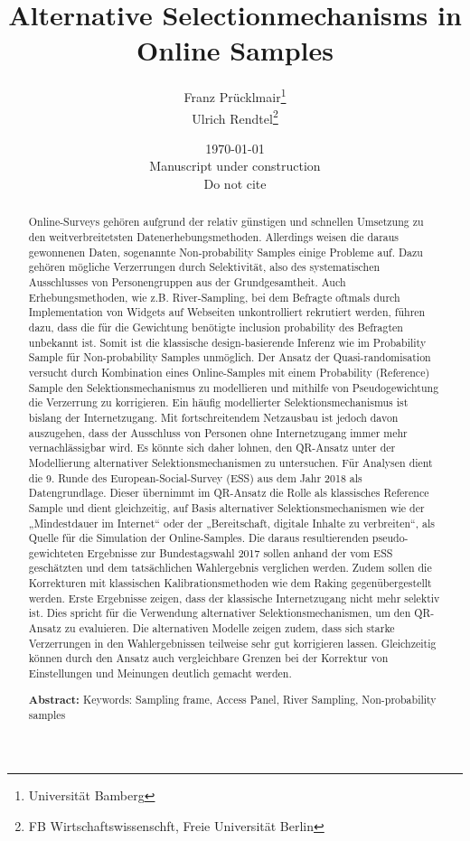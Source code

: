 \documentclass[a4paper , 11pt]{article}
\title{Alternative Selectionmechanisms in Online Samples}
\author  {Franz Prücklmair\thanks{Universität Bamberg} \\ Ulrich Rendtel\thanks{FB Wirtschaftswissenschft, Freie Universität Berlin} 
        }
\date{ \today\\Manuscript under construction\\ Do not cite}
\begin{document}
\maketitle
\tableofcontents
\newpage
\begin{abstract}

Online-Surveys gehören aufgrund der relativ günstigen und schnellen Umsetzung zu den weitverbreitetsten Datenerhebungsmethoden. Allerdings weisen die daraus gewonnenen Daten, sogenannte Non-probability Samples einige Probleme auf. Dazu gehören mögliche Verzerrungen durch Selektivität, also des systematischen Ausschlusses von Personengruppen aus der Grundgesamtheit. Auch Erhebungsmethoden, wie z.B. River-Sampling, bei dem Befragte oftmals durch Implementation von Widgets auf Webseiten unkontrolliert rekrutiert werden, führen dazu, dass die für die Gewichtung benötigte inclusion probability des Befragten unbekannt ist. Somit ist die klassische design-basierende Inferenz wie im Probability Sample für Non-probability Samples unmöglich.
Der Ansatz der Quasi-randomisation versucht durch Kombination eines Online-Samples mit einem Probability (Reference) Sample den Selektionsmechanismus zu modellieren und mithilfe von Pseudogewichtung die Verzerrung zu korrigieren. Ein häufig modellierter Selektionsmechanismus ist bislang der Internetzugang. Mit fortschreitendem Netzausbau ist jedoch davon auszugehen, dass der Ausschluss von Personen ohne Internetzugang immer mehr vernachlässigbar wird. Es könnte sich daher lohnen, den QR-Ansatz unter der Modellierung alternativer Selektionsmechanismen zu untersuchen.
Für Analysen dient die 9. Runde des European-Social-Survey (ESS) aus dem Jahr 2018 als Datengrundlage. Dieser übernimmt im QR-Ansatz die Rolle als klassisches Reference Sample und dient gleichzeitig, auf Basis alternativer Selektionsmechanismen wie der „Mindestdauer im Internet“ oder der „Bereitschaft, digitale Inhalte zu verbreiten“, als Quelle für die Simulation der Online-Samples. Die daraus resultierenden pseudo-gewichteten Ergebnisse zur Bundestagswahl 2017 sollen anhand der vom ESS geschätzten und dem tatsächlichen Wahlergebnis verglichen werden. Zudem sollen die Korrekturen mit klassischen Kalibrationsmethoden wie dem Raking gegenübergestellt werden.
Erste Ergebnisse zeigen, dass der klassische Internetzugang nicht mehr selektiv ist. Dies spricht für die Verwendung alternativer Selektionsmechanismen, um den QR-Ansatz zu evaluieren. Die alternativen Modelle zeigen zudem, dass sich starke Verzerrungen in den Wahlergebnissen teilweise sehr gut korrigieren lassen. Gleichzeitig können durch den Ansatz auch vergleichbare Grenzen bei der Korrektur von Einstellungen und Meinungen deutlich gemacht werden. 

\begin{center}
  \textbf{Abstract:} Keywords: Sampling frame, Access Panel, River Sampling, Non-probability samples
\end{center}



\end{abstract}
\newpage
\end{document}
